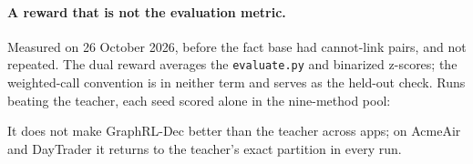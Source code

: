 \documentclass[10pt,a4paper]{article}
\begin{document}
\paragraph{A reward that is not the evaluation metric.} Measured on 26 October 2026, before the fact base had cannot-link pairs, and not repeated. The dual reward averages the \texttt{evaluate.py} and binarized z-scores; the weighted-call convention is in neither term and serves as the held-out check. Runs beating the teacher, each seed scored alone in the nine-method pool:
\begin{center}\small{}\end{center}
It does not make GraphRL-Dec better than the teacher across apps; on AcmeAir and DayTrader it returns to the teacher's exact partition in every run.
\end{document}
